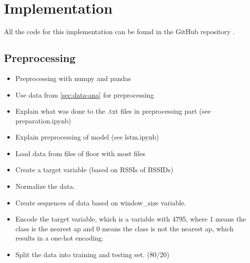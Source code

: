 \chapter{Implementation}\label{sec:implementation}


All the code for this implementation can be found in the GitHub repository \cite{github-repo}.

\section{Preprocessing}
\begin{itemize}
    \item Preprocessing with numpy and pandas
    \item Use data from \cref{sec:data-ana} for preprocessing
    \item Explain what was done to the .txt files in preprocessing part  (see \cite{github-repo} preparation.ipynb) 
    \item Explain preprocessing of model (see \cite{github-repo} lstm.ipynb)
    \item Load data from files of floor with most files
    \item Create a target variable (based on RSSIs of BSSIDs)
    \item Normalize the data.
    \item Create sequences of data based on window\_size variable.
    \item Encode the target variable, which is a variable with 4795,  where 1 means the class is the nearest \ac{ap} and 0 means the class is not the nearest \ac{ap}, which results in a one-hot encoding. 
    \item Split the data into training and testing set. (80/20)
\end{itemize}

%     

